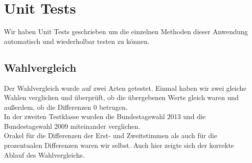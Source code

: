 \documentclass[12pt,a4paper,titlepage]{article}
\begin{document}
\section{Unit Tests}

Wir haben Unit Tests geschrieben um die einzelnen Methoden dieser Anwendung automatisch und wiederholbar testen zu können.

\subsection{Wahlvergleich}
Der Wahlvergleich wurde auf zwei Arten getestet. Einmal haben wir zwei gleiche Wahlen verglichen und überprüft, ob die übergebenen Werte gleich waren und außerdem, ob die Differenzen 0 betrugen. \\
In der zweiten Testklasse wurden die Bundestagswahl 2013 und die Bundestagswahl 2009 miteinander verglichen.\\
Orakel für die Differenzen der Erst- und Zweitstimmen als auch für die prozentualen Differenzen waren wir selbst. Auch hier zeigte sich der korrekte Ablauf des Wahlvergleichs. \\
\end{document}
